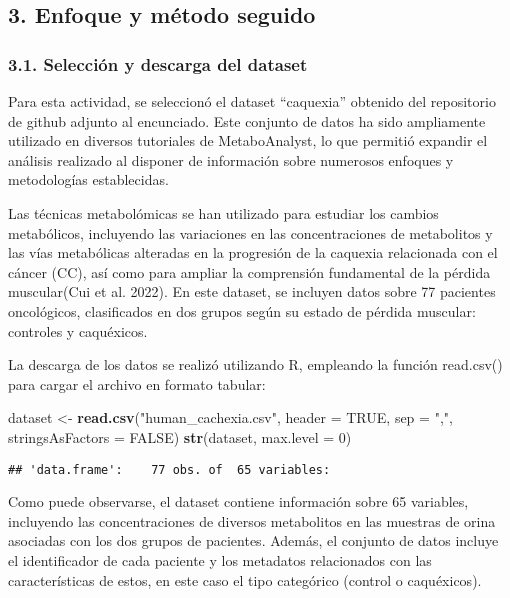\documentclass[
]{article}
\newenvironment{Shaded}{\begin{snugshade}}{\end{snugshade}}
\newcommand{\AttributeTok}[1]{\textcolor[rgb]{0.13,0.29,0.53}{#1}}
\newcommand{\ConstantTok}[1]{\textcolor[rgb]{0.56,0.35,0.01}{#1}}
\newcommand{\DecValTok}[1]{\textcolor[rgb]{0.00,0.00,0.81}{#1}}
\newcommand{\FunctionTok}[1]{\textcolor[rgb]{0.13,0.29,0.53}{\textbf{#1}}}
\newcommand{\NormalTok}[1]{#1}
\newcommand{\OtherTok}[1]{\textcolor[rgb]{0.56,0.35,0.01}{#1}}
\newcommand{\StringTok}[1]{\textcolor[rgb]{0.31,0.60,0.02}{#1}}
\begin{document}
\subsection{3. Enfoque y método
seguido}\label{enfoque-y-muxe9todo-seguido}

\subsubsection{3.1. Selección y descarga del
dataset}\label{selecciuxf3n-y-descarga-del-dataset}

Para esta actividad, se seleccionó el dataset ``caquexia'' obtenido del
repositorio de github adjunto al encunciado. Este conjunto de datos ha
sido ampliamente utilizado en diversos tutoriales de MetaboAnalyst, lo
que permitió expandir el análisis realizado al disponer de información
sobre numerosos enfoques y metodologías establecidas.

Las técnicas metabolómicas se han utilizado para estudiar los cambios
metabólicos, incluyendo las variaciones en las concentraciones de
metabolitos y las vías metabólicas alteradas en la progresión de la
caquexia relacionada con el cáncer (CC), así como para ampliar la
comprensión fundamental de la pérdida muscular(Cui et al. 2022). En este
dataset, se incluyen datos sobre 77 pacientes oncológicos, clasificados
en dos grupos según su estado de pérdida muscular: controles y
caquéxicos.

La descarga de los datos se realizó utilizando R, empleando la función
read.csv() para cargar el archivo en formato tabular:

\begin{Shaded}
\begin{Highlighting}[]
\NormalTok{dataset }\OtherTok{\textless{}{-}} \FunctionTok{read.csv}\NormalTok{(}\StringTok{"human\_cachexia.csv"}\NormalTok{, }\AttributeTok{header =} \ConstantTok{TRUE}\NormalTok{, }\AttributeTok{sep =} \StringTok{","}\NormalTok{, }\AttributeTok{stringsAsFactors =} \ConstantTok{FALSE}\NormalTok{)}
\FunctionTok{str}\NormalTok{(dataset, }\AttributeTok{max.level =} \DecValTok{0}\NormalTok{)}
\end{Highlighting}
\end{Shaded}

\begin{verbatim}
## 'data.frame':    77 obs. of  65 variables:
\end{verbatim}

Como puede observarse, el dataset contiene información sobre 65
variables, incluyendo las concentraciones de diversos metabolitos en las
muestras de orina asociadas con los dos grupos de pacientes. Además, el
conjunto de datos incluye el identificador de cada paciente y los
metadatos relacionados con las características de estos, en este caso el
tipo categórico (control o caquéxicos).
\end{document}

